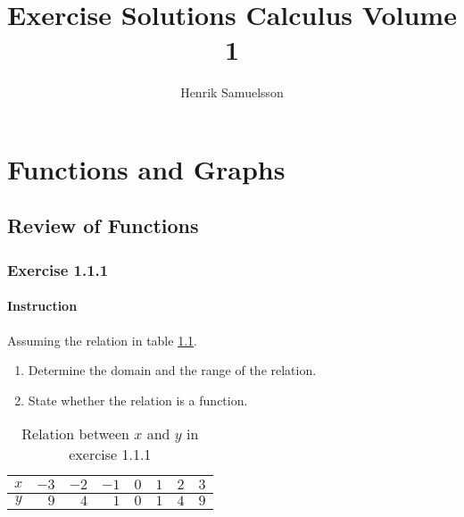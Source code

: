 \documentclass[11pt, letterpaper, oneside]{memoir}
\title{Exercise Solutions Calculus Volume 1}
\author{Henrik Samuelsson}
\date{ }
\begin{document}
\maketitle

\newpage

\tableofcontents

\chapter{Functions and Graphs}

\section{Review of Functions}








\subsection*{Exercise 1.1.1}

\subsubsection{Instruction}

Assuming the relation in table \ref{table:exercise-1.1.1}.
\begin{enumerate}[label=(\alph*)]
  \item Determine the domain and the range of the relation.
  \item State whether the relation is a function.
\end{enumerate}

\begin{table}[ht]
  \centering
  \begin{tabular}{ c | r r r r r r r }
    \hline
    $ x $ & $ -3 $ & $ -2 $ & $ -1 $ & $ 0 $ & $ 1 $ & $ 2 $ & $ 3 $ \\
    \hline
    $ y $ & $ 9 $ & $ 4 $ & $ 1 $ & $ 0 $ & $ 1 $ & $ 4 $ & $ 9 $ \\
    \hline
  \end{tabular}
  \caption{Relation between $ x $ and $ y $ in exercise 1.1.1}
  \label{table:exercise-1.1.1}
\end{table}
\end{document}
